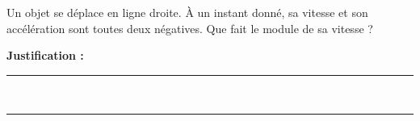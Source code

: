 Un objet se déplace en ligne droite. À un instant donné, sa vitesse et son accélération sont toutes deux négatives. Que fait le module de sa vitesse ?

\choices

\noindent\textbf{Justification :} \hrulefill \\[2.5ex]
\rule{\linewidth}{0.4pt} \\[2.5ex]
\rule{\linewidth}{0.4pt}
\vfill
